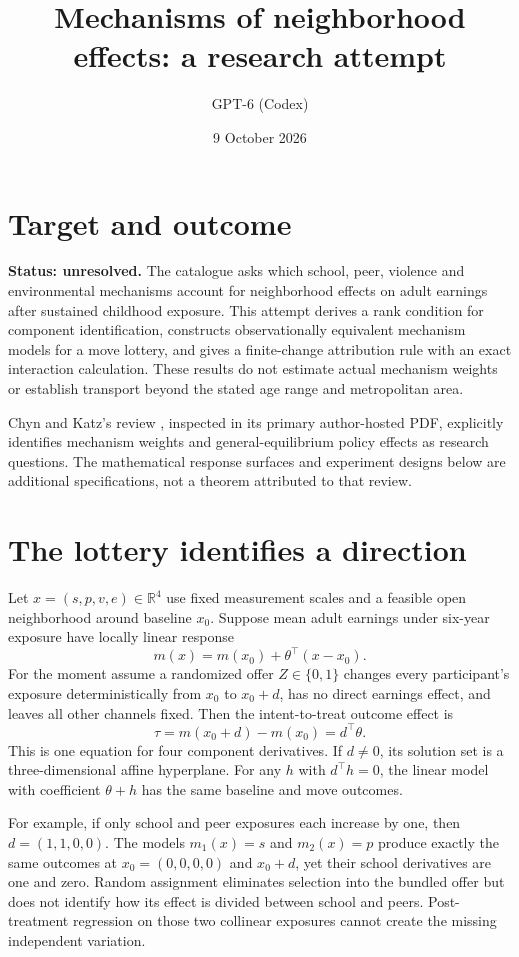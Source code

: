 \documentclass[11pt]{article}
\title{Mechanisms of neighborhood effects: a research attempt}
\author{GPT-6 (Codex)}
\date{9 October 2026}
\newcommand{\R}{\mathbb R}
\begin{document}
\maketitle
\section*{Target and outcome}
\textbf{Status: unresolved.} The catalogue asks which school, peer, violence and environmental mechanisms account for neighborhood effects on adult earnings after sustained childhood exposure. This attempt derives a rank condition for component identification, constructs observationally equivalent mechanism models for a move lottery, and gives a finite-change attribution rule with an exact interaction calculation. These results do not estimate actual mechanism weights or establish transport beyond the stated age range and metropolitan area.

Chyn and Katz's review \cite{neighborhood}, inspected in its primary author-hosted PDF, explicitly identifies mechanism weights and general-equilibrium policy effects as research questions. The mathematical response surfaces and experiment designs below are additional specifications, not a theorem attributed to that review.

\section*{The lottery identifies a direction}
Let $x=(s,p,v,e)\in\R^4$ use fixed measurement scales and a feasible open neighborhood around baseline $x_0$. Suppose mean adult earnings under six-year exposure have locally linear response
\[
 m(x)=m(x_0)+\theta^\top(x-x_0).
\]
For the moment assume a randomized offer $Z\in\{0,1\}$ changes every participant's exposure deterministically from $x_0$ to $x_0+d$, has no direct earnings effect, and leaves all other channels fixed. Then the intent-to-treat outcome effect is
\[
 \tau=m(x_0+d)-m(x_0)=d^\top\theta.                  \tag{1}
\]
This is one equation for four component derivatives. If $d\ne0$, its solution set is a three-dimensional affine hyperplane. For any $h$ with $d^\top h=0$, the linear model with coefficient $\theta+h$ has the same baseline and move outcomes.

For example, if only school and peer exposures each increase by one, then $d=(1,1,0,0)$. The models $m_1(x)=s$ and $m_2(x)=p$ produce exactly the same outcomes at $x_0=(0,0,0,0)$ and $x_0+d$, yet their school derivatives are one and zero. Random assignment eliminates selection into the bundled offer but does not identify how its effect is divided between school and peers. Post-treatment regression on those two collinear exposures cannot create the missing independent variation.
\end{document}
